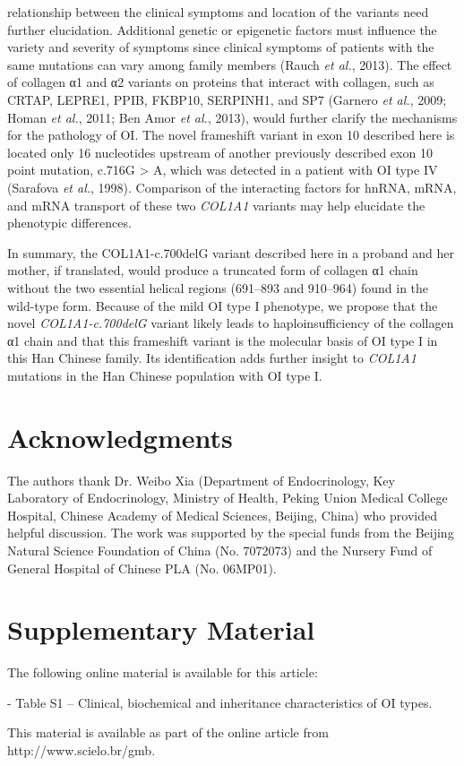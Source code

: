 relationship between the clinical symptoms and location of the variants need further elucidation. Additional genetic or epigenetic factors must influence the variety and severity of symptoms since clinical symptoms of patients with the same mutations can vary among family members (Rauch \textit{et al.}, 2013). The effect of collagen α1 and α2 variants on proteins that interact with collagen, such as CRTAP, LEPRE1, PPIB, FKBP10, SERPINH1, and SP7 (Garnero \textit{et al.}, 2009; Homan \textit{et al.}, 2011; Ben Amor \textit{et al.}, 2013), would further clarify the mechanisms for the pathology of OI. The novel frameshift variant in exon 10 described here is located only 16 nucleotides upstream of another previously described exon 10 point mutation, c.716G > A, which was detected in a patient with OI type IV (Sarafova \textit{et al.}, 1998). Comparison of the interacting factors for hnRNA, mRNA, and mRNA transport of these two \textit{COL1A1} variants may help elucidate the phenotypic differences.\par In summary, the COL1A1-c.700delG variant described here in a proband and her mother, if translated, would produce a truncated form of collagen α1 chain without the two essential helical regions (691–893 and 910–964) found in the wild-type form. Because of the mild OI type I phenotype, we propose that the novel \textit{COL1A1-c.700delG} variant likely leads to haploinsufficiency of the collagen α1 chain and that this frameshift variant is the molecular basis of OI type I in this Han Chinese family. Its identification adds further insight to \textit{COL1A1} mutations in the Han Chinese population with OI type I.
\section*{Acknowledgments}
\par The authors thank Dr. Weibo Xia (Department of Endocrinology, Key Laboratory of Endocrinology, Ministry of Health, Peking Union Medical College Hospital, Chinese Academy of Medical Sciences, Beijing, China) who provided helpful discussion. The work was supported by the special funds from the Beijing Natural Science Foundation of China (No. 7072073) and the Nursery Fund of General Hospital of Chinese PLA (No. 06MP01).

\section*{Supplementary Material}
\par The following online material is available for this article: \par - Table S1 – Clinical, biochemical and inheritance characteristics of OI types.
\par This material is available as part of the online article from http://www.scielo.br/gmb.

